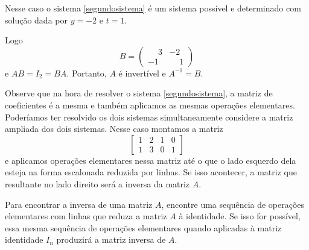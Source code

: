 Nesse caso o sistema \eqref{segundosistema} é um sistema possível e determinado com solução dada por $y = -2$ e $t = 1$.

Logo
\[
    B = \begin{pmatrix}
        \phantom{-}3 & -2\\
        -1 & \phantom{-}1
    \end{pmatrix}
\]
e $AB = I_2 = BA$. Portanto, $A$ é invertível e $A^{-1} = B$.

Observe que na hora de resolver o sistema \eqref{segundosistema}, a matriz de coeficientes é a mesma e também  aplicamos as mesmas operações elementares. Poderíamos ter resolvido os dois sistemas simultaneamente considere a matriz ampliada dos dois sistemas. Nesse caso montamos a matriz
\[
    \left[\begin{array}{cc|cc}
        1 & 2 & 1 & 0\\
        1 & 3 & 0 & 1
    \end{array}\right]
\]
e aplicamos operações elementares nessa matriz até o que o lado esquerdo dela esteja na forma escalonada reduzida por linhas. Se isso acontecer, a matriz que resultante no lado direito será a inversa da matriz $A$.

\begin{observacao}
    Para encontrar a inversa de uma matriz $A$, encontre uma sequência de operações elementares com linhas que reduza a matriz $A$ à identidade. Se isso for possível, essa mesma sequência de operações elementares quando aplicadas à matriz identidade $I_n$ produzirá a matriz inversa de $A$.
\end{observacao}

